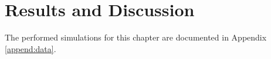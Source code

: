 
\chapter{Results and Discussion}
\label{chap:results}

\thispagestyle{empty}
\newpage

The performed simulations for this chapter are documented in Appendix \ref{append:data}.